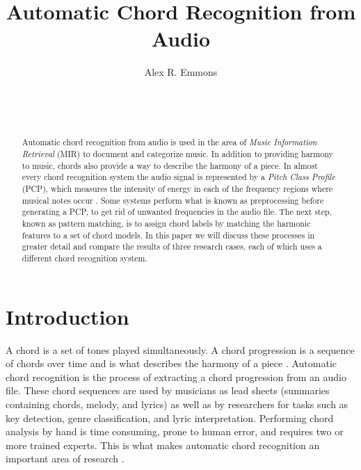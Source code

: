 \documentclass{sig-alternate}
\begin{document}

\title{Automatic Chord Recognition from Audio}


\author{
\alignauthor
Alex R. Emmons\\
	\\
	\\
	\\
}

\maketitle
\begin{abstract}
Automatic chord recognition from audio is used in the area of \textit{Music Information Retrieval} (MIR) to document and categorize music. In addition to providing harmony to music, chords also provide a way to describe the harmony of a piece. In almost every chord recognition system the audio signal is represented by a \textit{Pitch Class Profile} (PCP), which measures the intensity of energy in each of the frequency regions where musical notes occur \cite{Morman:2006}. Some systems perform what is known as preprocessing before generating a PCP, to get rid of unwanted frequencies in the audio file. The next step, known as pattern matching, is to assign chord labels by matching the harmonic features to a set of chord models. In this paper we will discuss these processes in greater detail and compare the results of three research cases, each of which uses a different chord recognition system.
\end{abstract}


\section{Introduction}
A chord is a set of tones played simultaneously. A chord progression is a sequence of chords over time and is what describes the harmony of a piece \cite{Lee:2006}. Automatic chord recognition is the process of extracting a chord progression from an audio file. These chord sequences are used by musicians as lead sheets (summaries containing chords, melody, and lyrics) as well as by researchers for tasks such as key detection, genre classification, and lyric interpretation. Performing chord analysis by hand is time consuming, prone to human error, and requires two or more trained experts. This is what makes automatic chord recognition an important area of research \cite{McVicar:2014}.
\end{document}
